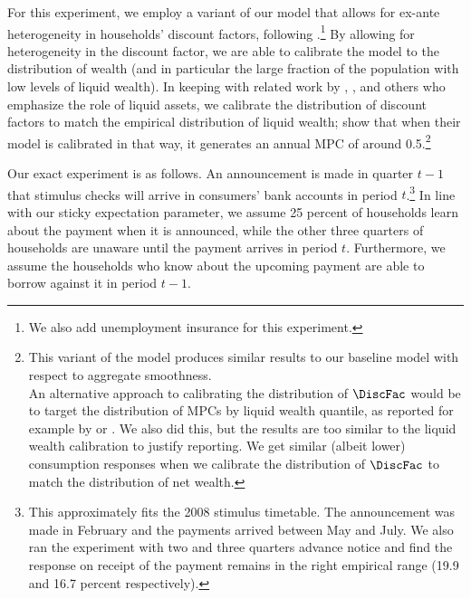   For this experiment, we employ a variant of our model that allows for ex-ante heterogeneity in households' discount factors, following \cite{cstwMPC}.\footnote{We also add unemployment insurance for this experiment.} By allowing for heterogeneity in the discount factor, we are able to calibrate the model to the distribution of wealth (and in particular the large fraction of the population with low levels of liquid wealth).  In keeping with related work by \cite{kvwWealthyH2m}, \cite{kmvHANK}, and others who emphasize the role of liquid assets, we calibrate the distribution of discount factors to match the empirical distribution of liquid wealth; \cite{cstwMPC} show that when their model is calibrated in that way, it generates an annual MPC of around 0.5.\footnote{This variant of the model produces similar results to our baseline model with respect to aggregate smoothness.\\
    An alternative approach to calibrating the distribution of $\DiscFac$ would be to target the distribution of MPCs by liquid wealth quantile, as reported for example by \cite{fhnMPC} or \cite{ckConsumption}. We also did this, but the results are too similar to the liquid wealth calibration to justify reporting.  We get similar (albeit lower) consumption responses when we calibrate the distribution of $\DiscFac$ to match the distribution of net wealth.}

  Our exact experiment is as follows.  An announcement is made in quarter $t-1$ that stimulus checks will arrive in consumers' bank accounts in period $t$.\footnote{This approximately fits the 2008 stimulus timetable. The announcement was made in February and the payments arrived between May and July. We also ran the experiment with two and three quarters advance notice and find the response on receipt of the payment remains in the right empirical range (19.9 and 16.7 percent respectively).} In line with our sticky expectation parameter, we assume 25 percent of households learn about the payment when it is announced, while the other three quarters of households are unaware until the payment arrives in period $t$. Furthermore, we assume the households who know about the upcoming payment are able to borrow against it in period $t-1$.

